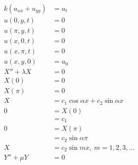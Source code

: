 \documentclass{article}
\begin{document}
\begin{align*}
  k (u_{x x} + u_{y y})    & = u_t                                                                                    \\
  u(0, y, t)               & = 0                                                                                      \\
  u(\pi, y, t)             & = 0                                                                                      \\
  u(x, 0, t)               & = 0                                                                                      \\
  u(x, \pi, t)             & = 0                                                                                      \\
  u(x, y, 0)               & = u_0                                                                                    \\
  X'' + \lambda X          & = 0                                                                                      \\
  X(0)                     & = 0                                                                                      \\
  X(\pi)                   & = 0                                                                                      \\
  X                        & = c_1 \cos \alpha x + c_2 \sin \alpha x                                                  \\
  0                        & = X(0)                                                                                   \\
                           & = c_1                                                                                    \\
  0                        & = X(\pi)                                                                                 \\
                           & = c_2 \sin \alpha \pi                                                                    \\
  X                        & = c_2 \sin m x,\ m = 1, 2, 3, \ldots                                                     \\
  Y'' + \mu Y              & = 0                                                                                      \\

\end{align*}
\end{document}
